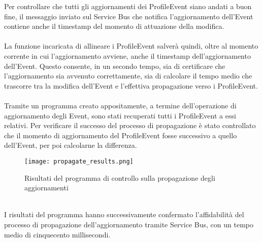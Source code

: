 Per controllare che tutti gli aggiornamenti dei ProfileEvent siano andati a buon fine,
il messaggio inviato sul Service Bus che notifica l'aggiornamento dell'Event 
contiene anche il timestamp del momento di attuazione della modifica.\\
\\
La funzione incaricata di allineare i ProfileEvent
salverà quindi, oltre al momento corrente in cui l'aggiornamento avviene,
anche il timestamp dell'aggiornamento dell'Event.
Questo consente, in un secondo tempo, 
sia di certificare che l'aggiornamento sia avvenuto correttamente, 
sia di calcolare il tempo medio che trascorre tra la modifica dell'Event 
e l'effettiva propagazione verso i ProfileEvent.\\
\\
Tramite un programma creato appositamente, 
a termine dell'operazione di aggiornamento degli Event,
sono stati recuperati tutti i ProfileEvent a essi relativi.
Per verificare il successo del processo di propagazione 
è stato controllato che il momento di aggiornamento del ProfileEvent 
fosse successivo a quello dell'Event, 
per poi calcolarne la differenza.\\
\begin{figure}[htbp]
    \begin{center}
        \texttt{[image: propagate\_results.png]}
        \caption{Risultati del programma di controllo sulla propagazione degli aggiornamenti}
    \end{center}
\end{figure}
\\
I risultati del programma hanno successivamente confermato l'affidabilità 
del processo di propagazione dell'aggiornamento tramite Service Bus, 
con un tempo medio di cinquecento millisecondi. 
\clearpage

